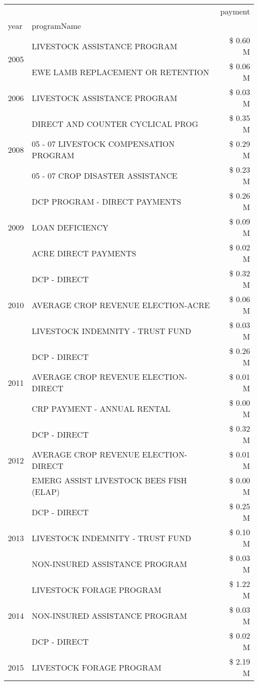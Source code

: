 \begin{tabular}{llr}
\toprule
 &  & payment \\
year & programName &  \\
\midrule
\multirow[t]{2}{*}{2005} & LIVESTOCK ASSISTANCE PROGRAM & \$ 0.60 M \\
 & EWE LAMB REPLACEMENT OR RETENTION & \$ 0.06 M \\
\cline{1-3}
2006 & LIVESTOCK ASSISTANCE PROGRAM & \$ 0.03 M \\
\cline{1-3}
\multirow[t]{3}{*}{2008} & DIRECT AND COUNTER CYCLICAL PROG & \$ 0.35 M \\
 & 05 - 07 LIVESTOCK COMPENSATION PROGRAM & \$ 0.29 M \\
 & 05 - 07 CROP DISASTER ASSISTANCE & \$ 0.23 M \\
\cline{1-3}
\multirow[t]{3}{*}{2009} & DCP PROGRAM - DIRECT PAYMENTS & \$ 0.26 M \\
 & LOAN DEFICIENCY & \$ 0.09 M \\
 & ACRE DIRECT PAYMENTS & \$ 0.02 M \\
\cline{1-3}
\multirow[t]{3}{*}{2010} & DCP - DIRECT & \$ 0.32 M \\
 & AVERAGE CROP REVENUE ELECTION-ACRE & \$ 0.06 M \\
 & LIVESTOCK INDEMNITY - TRUST FUND & \$ 0.03 M \\
\cline{1-3}
\multirow[t]{3}{*}{2011} & DCP - DIRECT & \$ 0.26 M \\
 & AVERAGE CROP REVENUE ELECTION-DIRECT & \$ 0.01 M \\
 & CRP PAYMENT - ANNUAL RENTAL & \$ 0.00 M \\
\cline{1-3}
\multirow[t]{3}{*}{2012} & DCP - DIRECT & \$ 0.32 M \\
 & AVERAGE CROP REVENUE ELECTION-DIRECT & \$ 0.01 M \\
 & EMERG ASSIST LIVESTOCK BEES FISH (ELAP) & \$ 0.00 M \\
\cline{1-3}
\multirow[t]{3}{*}{2013} & DCP - DIRECT & \$ 0.25 M \\
 & LIVESTOCK INDEMNITY - TRUST FUND & \$ 0.10 M \\
 & NON-INSURED ASSISTANCE PROGRAM & \$ 0.03 M \\
\cline{1-3}
\multirow[t]{3}{*}{2014} & LIVESTOCK FORAGE PROGRAM & \$ 1.22 M \\
 & NON-INSURED ASSISTANCE PROGRAM & \$ 0.03 M \\
 & DCP - DIRECT & \$ 0.02 M \\
\cline{1-3}
\multirow[t]{3}{*}{2015} & LIVESTOCK FORAGE PROGRAM & \$ 2.19 M \\

\end{tabular}
